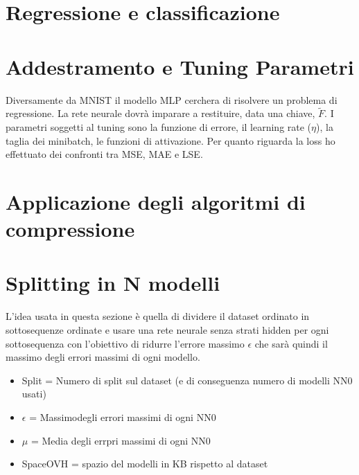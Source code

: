 \documentclass[11pt,a4paper,twoside,
openright]{book}
\begin{document}
\section*{Regressione e classificazione}

\section{Addestramento e Tuning Parametri}
Diversamente da MNIST il modello MLP cerchera di risolvere un problema di regressione. La rete neurale dovrà imparare a restituire, data una chiave, $\tilde{F}$.
I parametri soggetti al tuning sono la funzione di errore, il learning rate ($\eta$), la taglia dei minibatch, le funzioni di attivazione.
Per quanto riguarda la loss ho effettuato dei confronti tra MSE, MAE e LSE. 

\section{Applicazione degli algoritmi di compressione}
\section{Splitting in N modelli}
L'idea usata in questa sezione è quella di dividere il dataset ordinato in sottosequenze ordinate e usare una rete neurale senza strati hidden per ogni sottosequenza con l'obiettivo di ridurre l'errore massimo $\epsilon$ che sarà quindi il massimo degli errori massimi di ogni modello.

\begin{itemize}
		\item Split = Numero di split sul dataset (e di conseguenza numero di modelli NN0 usati)
		\item $\epsilon$ = Massimodegli errori massimi di ogni NN0
		\item $\mu$ = Media degli errpri massimi di ogni NN0
		\item SpaceOVH =  spazio del modelli in KB rispetto al dataset
	\end{itemize}
	
\end{document}

